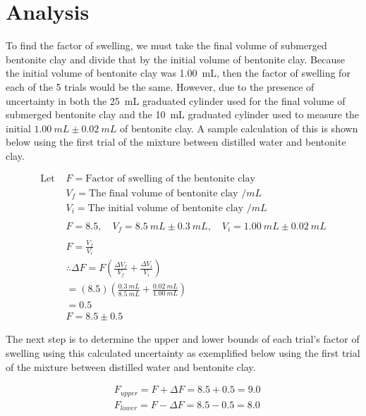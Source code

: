 \documentclass[11pt, letterpaper]{article}
\begin{document}
\section{Analysis}

To find the factor of swelling, we must take the final volume of submerged
bentonite clay and divide that by the initial volume of bentonite clay.
Because the initial volume of bentonite clay was \SI{1.00}{mL}, then
the factor of swelling for each of the 5 trials would be the same.
However, due to the presence of uncertainty in both the \SI{25}{mL}
graduated cylinder used for the final volume of submerged bentonite clay
and the \SI{10}{mL} graduated cylinder used to measure the initial
\(\SI{1.00}{mL} \pm \SI{0.02}{mL}\) of bentonite clay.
A sample calculation of this is shown below using the first trial
of the mixture between distilled water and bentonite clay.

\begin{align*}
    \text{Let } & F = \text{Factor of swelling of the bentonite clay}
    \\
                & V_f = \text{The final volume of bentonite clay } /\unit{mL}
    \\
                & V_i = \text{The initial volume of bentonite clay } /\unit{mL}
    \\
    \\
                & F = 8.5,\quad V_f = \SI{8.5}{mL} \pm \SI{0.3}{mL},\quad V_i = \SI{1.00}{mL} \pm \SI{0.02}{mL}
    \\
    \\
                & F = \frac{V_f}{V_i}
    \\
                & \therefore \Delta F = F\left( \frac{\Delta V_f}{V_f} + \frac{\Delta V_i}{V_i} \right)
    \\
                & = (8.5)\left( \frac{\SI{0.3}{mL}}{\SI{8.5}{mL}} + \frac{\SI{0.02}{mL}}{\SI{1.00}{mL}} \right)
    \\
                & = 0.5
    \\
                & F = 8.5 \pm 0.5
\end{align*}

The next step is to determine the upper and lower bounds of each trial's factor of swelling
using this calculated uncertainty as exemplified below using
the first trial of the mixture between distilled water and
bentonite clay.

\begin{align*}
     & F_{upper} = F + \Delta F = 8.5 + 0.5 = 9.0
    \\
     & F_{lower} = F - \Delta F = 8.5 - 0.5 = 8.0
\end{align*}
\end{document}

